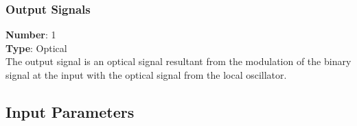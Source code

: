 \begin{subs}
\subsubsection*{Output Signals}
\end{subs}
\hspace*{0.5in}\textbf{Number}: 1\\
\hspace*{0.5in}\textbf{Type}: Optical
\\
The output signal is an optical signal resultant from the modulation of the binary signal at the input with the optical signal from the local oscillator.


\subsection*{Input Parameters}

